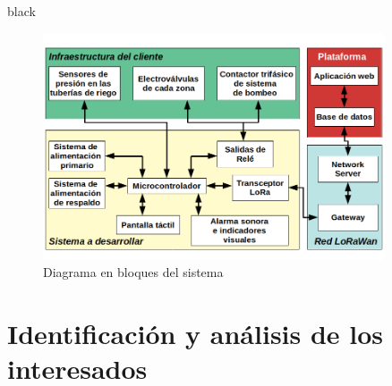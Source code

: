 \documentclass[11pt]{charter}
\begin{document}
\begin{consigna}{black}
\vspace{25px}

\begin{figure}[htpb]
\centering 
\includegraphics[width=0.9\textwidth]{./Figuras/DiagramaBloques.png}
\caption{Diagrama en bloques del sistema}

\label{fig:diagBloques}
\end{figure}

\vspace{25px}

\end{consigna}


\section{Identificación y análisis de los interesados}
\label{sec:interesados}
\end{document}
